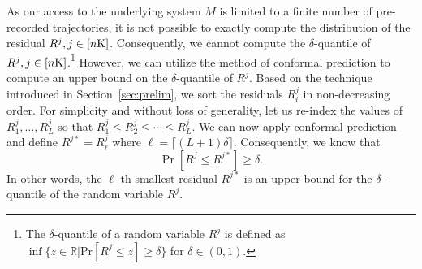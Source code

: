 





As our access to the underlying system $M$ is limited to a finite number of pre-recorded trajectories, it is not possible to exactly compute the distribution of the residual $R^j, j \in [n\mathrm{K}]$. Consequently, we cannot   compute the $\delta$-quantile of $R^j, j \in [n\mathrm{K}]$.\footnote{The $\delta$-quantile of a random variable $R^j$ is defined as $\inf\{z\in\mathbb{R} | \text{Pr}[R^j\le z]\ge  \delta\}$ for $\delta \in (0,1)$.}  However, we can utilize the method of conformal prediction \cite{vovk2005algorithmic} to compute  an upper bound on the $\delta$-quantile of $R^j$. Based on the technique introduced in Section~\ref{sec:prelim}, we sort the  residuals $R^j_i$ in non-decreasing order. For simplicity and without loss of generality, let us re-index the values of $R^j_1,\hdots, R^j_L$ so that $R^j_1 \leq R^j_2 \leq \cdots \leq R^j_L$. We can now apply conformal prediction and define $R^{j*} = R^j_\ell$ where $\ell = \lceil (L+1 ) \delta \rceil$. Consequently, we know that
$$
\Pr[R^j \leq R^{j*}] \geq \delta.
$$
In other words, the $\ell$-th smallest residual $R^{j*}$ is an upper bound for the $\delta$-quantile of the random variable $R^j$.

